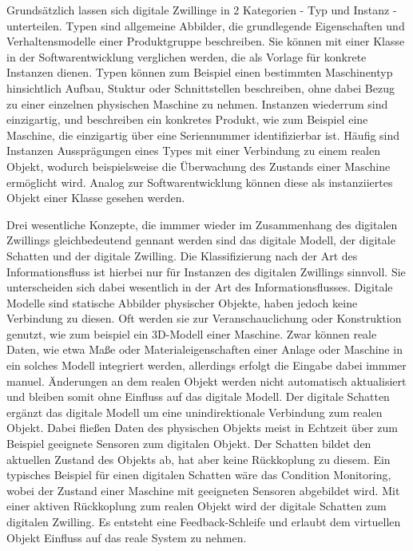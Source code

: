Grundsätzlich lassen sich digitale Zwillinge in 2 Kategorien - Typ und Instanz - unterteilen.
Typen sind allgemeine Abbilder, die grundlegende Eigenschaften und Verhaltensmodelle einer Produktgruppe beschreiben. 
Sie können mit einer Klasse in der Softwarentwicklung verglichen werden, die als Vorlage für konkrete Instanzen dienen.
Typen können zum Beispiel einen bestimmten Maschinentyp hinsichtlich Aufbau, Stuktur oder Schnittstellen beschreiben, ohne dabei Bezug zu einer einzelnen physischen Maschine zu nehmen.
Instanzen wiederrum sind einzigartig, und beschreiben ein konkretes Produkt, wie zum Beispiel eine Maschine, die einzigartig über eine Seriennummer identifizierbar ist.
Häufig sind Instanzen Aussprägungen eines Types mit einer Verbindung zu einem realen Objekt, wodurch beispielsweise die Überwachung des Zustands einer Maschine ermöglicht wird.
Analog zur Softwarentwicklung können diese als instanziiertes Objekt einer Klasse gesehen werden. \cite{ZEISS}

Drei wesentliche Konzepte, die immmer wieder im Zusammenhang des digitalen Zwillings gleichbedeutend gennant werden sind das digitale Modell, der digitale Schatten und der digitale Zwilling. \cite{ClassificationDT}
Die Klassifizierung nach der Art des Informationsfluss ist hierbei nur für Instanzen des digitalen Zwillings sinnvoll.
Sie unterscheiden sich dabei wesentlich in der Art des Informationsflusses.
Digitale Modelle sind statische Abbilder physischer Objekte, haben jedoch keine Verbindung zu diesen. 
Oft werden sie zur Veranschauclichung oder Konstruktion genutzt, wie zum beispiel ein 3D-Modell einer Maschine.
Zwar können reale Daten, wie etwa Maße oder Materialeigenschaften einer Anlage oder Maschine in ein solches Modell integriert werden, allerdings erfolgt die Eingabe dabei immmer manuel.
Änderungen an dem realen Objekt werden nicht automatisch aktualisiert und bleiben somit ohne Einfluss auf das digitale Modell.
Der digitale Schatten ergänzt das digitale Modell um eine unindirektionale Verbindung zum realen Objekt.
Dabei fließen Daten des physischen Objekts meist in Echtzeit über zum Beispiel geeignete Sensoren zum digitalen Objekt.
Der Schatten bildet den aktuellen Zustand des Objekts ab, hat aber keine Rückkoplung zu diesem.
Ein typisches Beispiel für einen digitalen Schatten wäre das Condition Monitoring, wobei der Zustand einer Maschine mit geeigneten Sensoren abgebildet wird.
Mit einer aktiven Rückkoplung zum realen Objekt wird der digitale Schatten zum digitalen Zwilling.
Es entsteht eine Feedback-Schleife und erlaubt dem virtuellen Objekt Einfluss auf das reale System zu nehmen.

